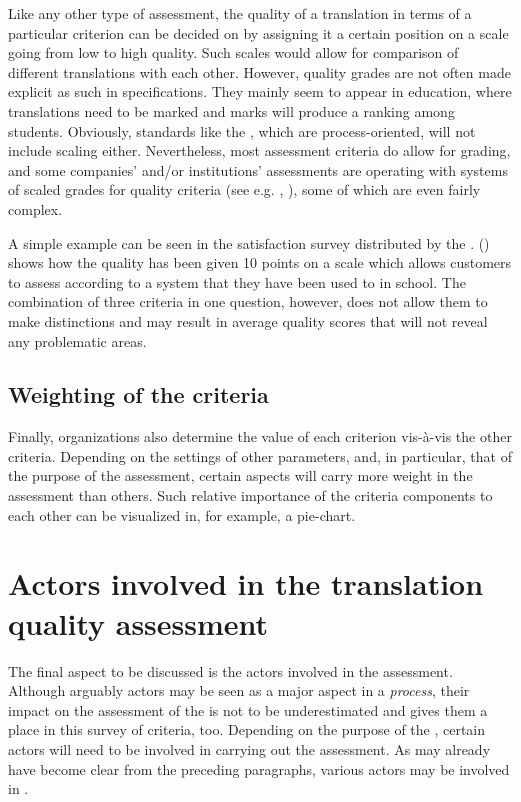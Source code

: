 \documentclass[output=paper]{langsci/langscibook}
\begin{document}
Like any other type of assessment, the quality of a translation in terms of a particular criterion can be decided on by assigning it a certain position on a scale going from low to high quality. Such scales would allow for comparison of different translations with each other. However, quality grades are not often made explicit as such in specifications. They mainly seem to appear in education, where translations need to be marked and marks will produce a ranking among students. Obviously, standards like the \citeauthor{ISO2015}, which are process-oriented, will not include scaling either. Nevertheless, most assessment criteria do allow for grading, and some companies' and/or institutions' assessments are operating with systems of scaled grades for quality criteria (see e.g. \citeauthor{Strandvik2015}, ), some of which are even fairly complex. 



A simple example can be seen in the satisfaction survey distributed by the \citet{SCTA2015}.  () shows how the quality has been given 10 points on a scale which allows customers to assess according to a system that they have been used to in school. The combination of three criteria in one question, however, does not allow them to make distinctions and may result in average quality scores that will not reveal any problematic areas.


\subsection{Weighting of the criteria}\label{sec:vandepitte:4.2}

Finally, organizations also determine the value of each criterion vis-à-vis the other criteria. Depending on the settings of other parameters, and, in particular, that of the purpose of the assessment, certain aspects will carry more weight in the assessment than others. Such relative importance of the criteria components to each other can be visualized in, for example, a pie-chart.

\section{Actors involved in the translation quality assessment}\label{sec:vandepitte:5}

The final aspect to be discussed is the actors involved in the  assessment. Although arguably actors may be seen as a major aspect in a \textit{process}, their impact on the assessment of the  is not to be underestimated and gives them a place in this survey of  criteria, too. Depending on the purpose of the , certain actors will need to be involved in carrying out the  assessment. As may already have become clear from the preceding paragraphs, various actors may be involved in . 
\end{document}
